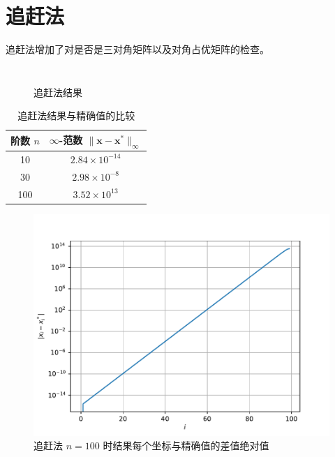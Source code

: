 \documentclass{sjtuarticle}
\begin{document}
\section{追赶法}

追赶法增加了对是否是三对角矩阵以及对角占优矩阵的检查。

\inputminted[firstline=94,lastline=134]{python3}{main.py}
\begin{minipage}{0.5\textwidth}
    \begin{figure}[H]
        \centering
        \inputminted[firstline=58,lastline=94,fontsize=\tiny]{text}{stdout.txt}
        \caption{追赶法结果}
    \end{figure}
\end{minipage}
\begin{minipage}{0.45\textwidth}
    \begin{table}[H]
        \centering
        \caption{追赶法结果与精确值的比较}
        \begin{tabular}{cc}
            \toprule
            阶数 $n$ & $\infty$-范数 $\lVert \bm{x}-\bm{x}^* \rVert_\infty$ \\
            \midrule
            10  & $2.84\times 10^{-14}$ \\
            30  & $2.98\times 10^{-8}$ \\
            100 & $3.52\times 10^{13}$ \\
            \bottomrule
        \end{tabular}
    \end{table}
    \vspace*{-0.75cm}
    \begin{figure}[H]
        \centering
        \includegraphics[width=\textwidth]{pic/ThomasSolver.pdf}
        \caption{追赶法 $n=100$ 时结果每个坐标与精确值的差值绝对值}
    \end{figure}
\end{minipage}
\end{document}
